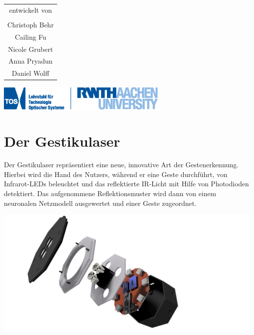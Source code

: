 \documentclass[a4paper,12pt,notumble]{leaflet}
\begin{document}
\begin{center}
\begin{tabular}{c}
	entwickelt von \\ \\
	Christoph Behr \\
	Cailing Fu \\
	Nicole Grubert \\
	Anna Pryadun \\
	Daniel Wolff
\end{tabular}

\vfill

\includegraphics[height=1.25cm]{../Logos/TOS.eps}

\end{center}

\newpage
\raggedright



\noindent
\begin{minipage}[c][0.58\textheight][t]{\textwidth}

	\section{Der Gestikulaser}

	Der Gestikulaser repräsentiert eine neue, innovative Art der Gestenerkennung. Hierbei wird die Hand des Nutzers, während er eine Geste durchführt, von 
	Infrarot-LEDs beleuchtet und das reflektierte IR-Licht mit Hilfe von Photodioden detektiert. Das aufgenommene Reflektionsmuster wird dann von einem neuronalen 
	Netzmodell ausgewertet und einer Geste zugeordnet. 
	
	\vspace{0.5cm}

	\centering
	\includegraphics[scale=0.3]{../CAD_Bilder/Oktokommander/Oktokommander_raytraced.png}
	
	\vfill
	
\end{minipage}
\end{document}
